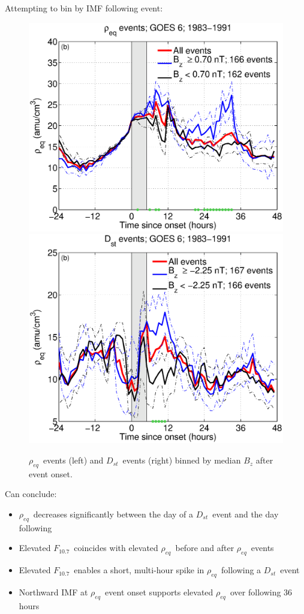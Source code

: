 \documentclass[xcolor={dvipsnames,table}]{beamer}
\newcommand{\req}{\ensuremath{\rho_{eq}}} %
\newcommand{\dst}{\ensuremath{D_{st}}} %
\newcommand{\f}{\ensuremath{F_{10.7}}} %
\begin{document}
\begin{frame}
	Attempting to bin by IMF following event:
		\begin{figure}[htp!]
			\centering
			\includegraphics[width=0.5\linewidth]{Figures/RhoBinnedB_z-case24-t025-tf30-GOES6}
			\includegraphics[width=0.5\linewidth]{Figures/RhoBinnedB_z-case1-t025-tf30-GOES6}
			\caption{\req\ events (left) and \dst\ events (right) binned by median $B_z$ after event onset.}
			\label{fig:RhoBinnedF107}
		\end{figure}
\end{frame}

\begin{frame}
	Can conclude:
	\begin{itemize}
		\item \req\ decreases significantly between the day of a \dst\ event and the day following
		\item Elevated \f\ coincides with elevated \req\ before and after \req\ events
		\item Elevated \f\ enables a short, multi-hour spike in \req\ following a \dst\ event
		\item Northward IMF at \req\ event onset supports elevated \req\ over following 36 hours
	\end{itemize}
\end{frame}
\end{document}
